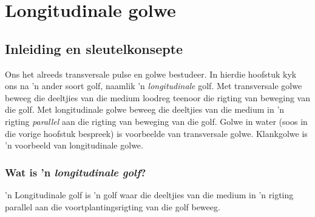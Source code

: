 \chapter{Longitudinale golwe}

    \setcounter{figure}{1}
    \setcounter{subfigure}{1}
    \label{e91550bed2a1600e0ddb2572d580bf8e}
         \section{Inleiding en sleutelkonsepte}
    \nopagebreak
    \label{m38782*id291765}Ons het alreeds transversale pulse en golwe bestudeer.
    In hierdie hoofstuk kyk ons na 'n ander soort golf, naamlik 'n \textsl{longitudinale} golf.
    Met transversale golwe beweeg die deeltjies van die medium loodreg teenoor die rigting van beweging van die golf.
    Met longitudinale golwe beweeg die deeltjies van die medium in 'n rigting \textsl{parallel} aan die rigting van beweging van die golf. 
    Golwe in water (soos in die vorige hoofstuk bespreek) is voorbeelde van transversale golwe.
    Klankgolwe is 'n voorbeeld van longitudinale golwe.\par 
    \label{m38782*cid3}




            \subsection*{Wat is 'n \textsl{longitudinale golf}?}
            \nopagebreak
\par
{} { \label{m38782*meaningfhsst!!!underscore!!!id64}
       'n Longitudinale golf is 'n golf waar die deeltjies van die medium in 'n rigting parallel aan die voortplantingsrigting van die golf beweeg.
       } 
      
